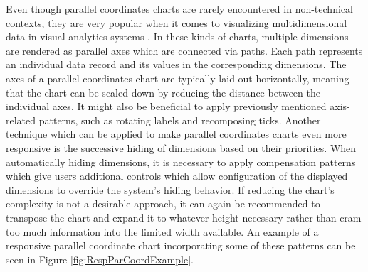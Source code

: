 Even though parallel coordinates charts are rarely encountered in non-technical contexts, they are very popular when it comes to visualizing multidimensional data in visual analytics systems \parencite{HighD}.
In these kinds of charts, multiple dimensions are rendered as parallel axes which are connected via paths.
Each path represents an individual data record and its values in the corresponding dimensions.
The axes of a parallel coordinates chart are typically laid out horizontally, meaning that the chart can be scaled down by reducing the distance between the individual axes.
It might also be beneficial to apply previously mentioned axis-related patterns, such as rotating labels and recomposing ticks.
Another technique which can be applied to make parallel coordinates charts even more responsive is the successive hiding of dimensions based on their priorities.
When automatically hiding dimensions, it is necessary to apply compensation patterns which give users additional controls which allow configuration of the displayed dimensions to override the system's hiding behavior.
If reducing the chart's complexity is not a desirable approach, it can again be recommended to transpose the chart and expand it to whatever height necessary rather than cram too much information into the limited width available.
An example of a responsive parallel coordinate chart incorporating some of these patterns can be seen in Figure \ref{fig:RespParCoordExample}.

